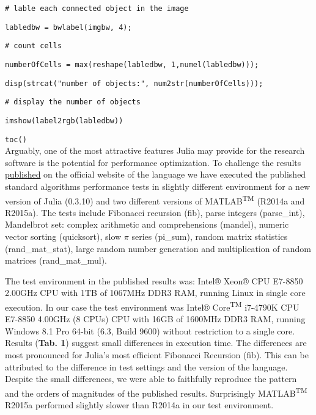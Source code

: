 \verb|# lable each connected object in the image|

\verb|labledbw = bwlabel(imgbw, 4);|

\verb|# count cells|

\verb|numberOfCells = max(reshape(labledbw, 1,numel(labledbw)));|

\verb|disp(strcat("number of objects:", num2str(numberOfCells)));|

\verb|# display the number of objects|

\verb|imshow(label2rgb(labledbw))|

\verb|toc()|\\



Arguably, one of the most attractive features Julia may provide for the research software is the potential for performance optimization. To challenge the results \href{http://julialang.org/benchmarks/}{published} on the official website of the language we have executed the published standard algorithms performance tests in slightly different environment for a new version of Julia (0.3.10) and two different versions of MATLAB\textsuperscript{TM} (R2014a and R2015a). The tests include Fibonacci recursion (fib), parse integers (parse\_int), Mandelbrot set: complex arithmetic and comprehensions (mandel), numeric vector sorting (quicksort), slow $\pi$ series (pi\_sum), random matrix statistics (rand\_mat\_stat), large random number generation and multiplication of random matrices (rand\_mat\_mul).

The test environment in the published results was: Intel® Xeon® CPU E7-8850 2.00GHz CPU with 1TB of 1067MHz DDR3 RAM, running Linux in single core execution. In our case the test environment was Intel® Core\textsuperscript{TM} i7-4790K CPU E7-8850 4.00GHz (8 CPUs) CPU with 16GB of 1600MHz DDR3 RAM, running Windows 8.1 Pro 64-bit (6.3, Build 9600) without restriction to a single core. Results (\textbf{Tab. 1}) suggest small differences in execution time. The differences are most pronounced for Julia's most efficient Fibonacci Recursion (fib). This can be attributed to the difference in test settings and the version of the language. Despite the small differences, we were able to faithfully reproduce the pattern and the orders of magnitudes of the published results. Surprisingly MATLAB\textsuperscript{TM} R2015a performed slightly slower than R2014a in our test environment.

